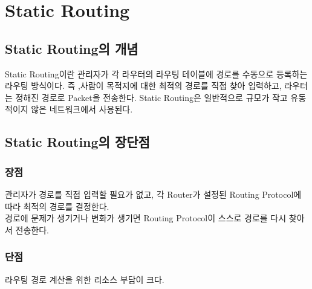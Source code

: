 \section{Static Routing}
\subsection{Static Routing의 개념}
    Static Routing이란 관리자가 각 라우터의 라우팅 테이블에 경로를 수동으로 등록하는 라우팅 방식이다. 즉 ,사람이 목적지에 대한 최적의 경로를 직접 찾아 입력하고, 라우터는 정해진 경로로 Packet을 전송한다. Static Routing은 일반적으로 규모가 작고 유동적이지 않은 네트워크에서 사용된다. \\
    
\subsection{Static Routing의 장단점}
    \subsubsection*{장점}
    관리자가 경로를 직접 입력할 필요가 없고, 각 Router가 설정된 Routing Protocol에 따라 최적의 경로를 결정한다. \\
    경로에 문제가 생기거나 변화가 생기면 Routing Protocol이 스스로 경로를 다시 찾아서 전송한다. \\
    \subsubsection*{단점}
   라우팅 경로 계산을 위한 리소스 부담이 크다. \\